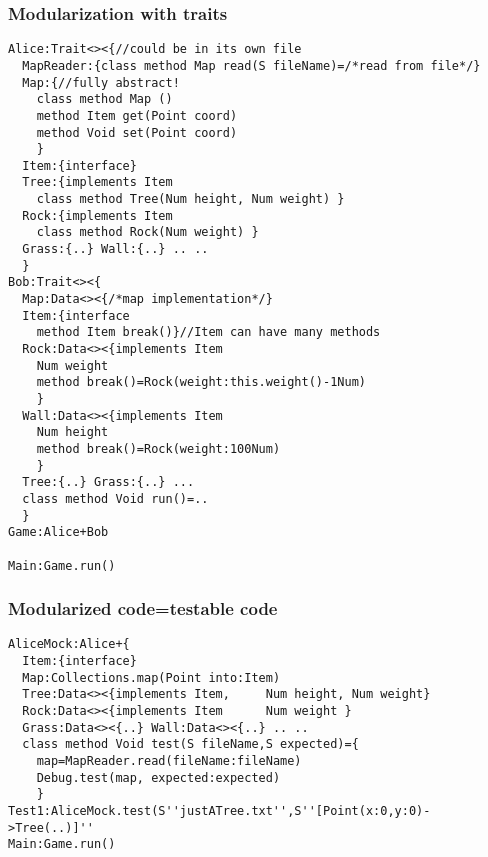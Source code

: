 \begin{frame}[fragile]
\frametitle{Modularization with traits}
\begin{NiceCode}{59ex}{0.8}
\begin{lstlisting}
Alice:Trait<><{//could be in its own file
  MapReader:{class method Map read(S fileName)=/*read from file*/}
  Map:{//fully abstract!
    class method Map ()
    method Item get(Point coord)
    method Void set(Point coord)
    }
  Item:{interface}
  Tree:{implements Item
    class method Tree(Num height, Num weight) }
  Rock:{implements Item
    class method Rock(Num weight) }
  Grass:{..} Wall:{..} .. ..
  }
Bob:Trait<><{
  Map:Data<><{/*map implementation*/}
  Item:{interface 
    method Item break()}//Item can have many methods
  Rock:Data<><{implements Item
    Num weight
    method break()=Rock(weight:this.weight()-1Num)
    }
  Wall:Data<><{implements Item
    Num height
    method break()=Rock(weight:100Num)
    }
  Tree:{..} Grass:{..} ...
  class method Void run()=..
  }
Game:Alice+Bob

Main:Game.run()
\end{lstlisting}
\end{NiceCode}
\end{frame}

\begin{frame}[fragile]
\frametitle{Modularized code=testable code}
\begin{NiceCode}{59ex}{0.8}
\begin{lstlisting}
AliceMock:Alice+{
  Item:{interface}
  Map:Collections.map(Point into:Item)
  Tree:Data<><{implements Item,     Num height, Num weight}
  Rock:Data<><{implements Item      Num weight }
  Grass:Data<><{..} Wall:Data<><{..} .. ..
  class method Void test(S fileName,S expected)={
    map=MapReader.read(fileName:fileName)
    Debug.test(map, expected:expected)
    }
Test1:AliceMock.test(S''justATree.txt'',S''[Point(x:0,y:0)->Tree(..)]''
Main:Game.run()
\end{lstlisting}
\end{NiceCode}
\end{frame}


